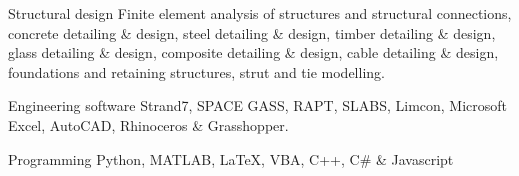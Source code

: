

\begin{cvskills}

  \cvskill
    {Structural design} %
    {Finite element analysis of structures and structural connections, concrete detailing \& design, steel detailing \newline \& design, timber detailing \& design, glass detailing \& design, composite detailing \& design, cable detailing \& \newline design, foundations and retaining structures, strut and tie modelling.} %

  \cvskill
    {Engineering software} %
    {Strand7, SPACE GASS, RAPT, SLABS, Limcon, Microsoft Excel, AutoCAD, Rhinoceros \& Grasshopper.} %

  \cvskill
    {Programming} %
    {Python, MATLAB, \LaTeX, VBA, C++, C\# \& Javascript} %

\end{cvskills}
